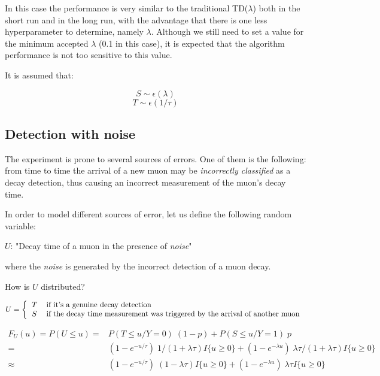 \documentclass[11pt,A4paper]{article}
\begin{document}
In this case the performance is very similar to the traditional TD($\lambda$) both in the short run and in the long run, with the advantage that there is one less hyperparameter to determine, namely $\lambda$. Although we still need to set a value for the minimum accepted $\lambda$ (0.1 in this case), it is expected that the algorithm performance is not too sensitive to this value.


\newpage







\iffalse

\medskip
It is assumed that:

\[S \sim \epsilon(\lambda)\]
\[T \sim \epsilon(1/\tau)\]

\subsection{Detection with noise}
The experiment is prone to several sources of errors. One of them is the following: from time to time the arrival of a new muon may be \textit{incorrectly classified} as a decay detection, thus causing an incorrect measurement of the muon's decay time.

\medskip
In order to model different sources of error, let us define the following random variable:

$U$: "Decay time of a muon in the presence of \textit{noise}"

where the \textit{noise} is generated by the incorrect detection of a muon decay.

\medskip
How is $U$ distributed?

\[ \\
U =
\left \{
  \begin{tabular}{ll}
  $T$ & \textrm{if it's a genuine decay detection} \\
  $S$ & \textrm{if the decay time measurement was triggered by the arrival of another muon} \\
  \end{tabular}
\right.
\]

\begin{align*}
F_U(u) 	= P(U \leq u) 	= & P(T \leq u /Y\!=\!0) \; (1-p) + P(S \leq u /Y\!=\!1) \; p \\
						= & (1 - e^{-u/\tau}) \; 1/(1 + \lambda \tau) I\{u \geq 0\} + 
							(1 - e^{-\lambda u}) \; \lambda \tau /(1 + \lambda \tau) I\{u \geq 0\} \\
						\approx & (1 - e^{-u/\tau}) \; (1 - \lambda \tau) I\{u \geq 0\} +
							 (1 - e^{-\lambda u}) \; \lambda \tau I\{u \geq 0\}
\end{align*}
\end{document}
